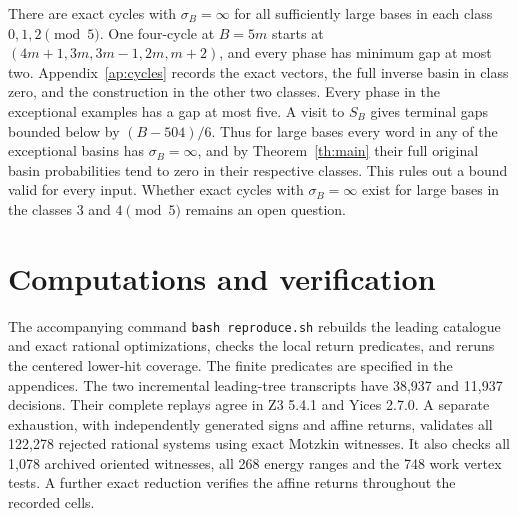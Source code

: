 \documentclass[11pt,reqno]{amsart}
\theoremstyle{remark}
\begin{document}
There are exact cycles with \(\sigma_B=\infty\) for all sufficiently large bases in each class \(0,1,2\pmod5\). One four-cycle at \(B=5m\) starts at \((4m+1,3m,3m-1,2m,m+2)\), and every phase has minimum gap at most two. Appendix~\ref{ap:cycles} records the exact vectors, the full inverse basin in class zero, and the construction in the other two classes. Every phase in the exceptional examples has a gap at most five. A visit to \(S_B\) gives terminal gaps bounded below by \((B-504)/6\). Thus for large bases every word in any of the exceptional basins has \(\sigma_B=\infty\), and by Theorem~\ref{th:main} their full original basin probabilities tend to zero in their respective classes. This rules out a bound valid for every input. Whether exact cycles with \(\sigma_B=\infty\) exist for large bases in the classes \(3\) and \(4\pmod5\) remains an open question.

\section{Computations and verification}\label{sec:computation}

The accompanying command \texttt{bash reproduce.sh} rebuilds the leading catalogue and exact rational optimizations, checks the local return predicates, and reruns the centered lower-hit coverage. The finite predicates are specified in the appendices. The two incremental leading-tree transcripts have 38,937 and 11,937 decisions. Their complete replays agree in Z3 5.4.1 and Yices 2.7.0. A separate exhaustion, with independently generated signs and affine returns, validates all 122,278 rejected rational systems using exact Motzkin witnesses. It also checks all 1,078 archived oriented witnesses, all 268 energy ranges and the 748 work vertex tests. A further exact reduction verifies the affine returns throughout the recorded cells.
\end{document}
